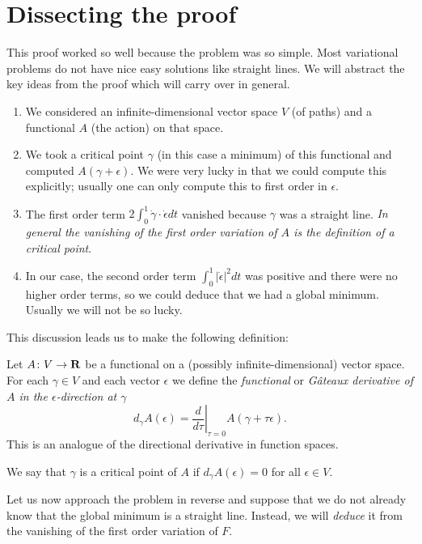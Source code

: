 \section{Dissecting the proof}

This proof worked so well because the problem was so simple. Most variational problems do not have nice easy solutions like straight lines. We will abstract the key ideas from the proof which will carry over in general.
\begin{enumerate}
\item We considered an infinite-dimensional vector space $V$ (of paths) and a functional $A$ (the action) on that space.
\item We took a critical point $\gamma$ (in this case a minimum) of this functional and computed $A(\gamma+\epsilon)$. We were very lucky in that we could compute this explicitly; usually one can only compute this to first order in $\epsilon$.
\item The first order term $2\int_0^1\dot{\gamma}\cdot\dot{\epsilon}dt$ vanished because $\gamma$ was a straight line. {\em In general the vanishing of the first order variation of $A$ is the definition of a critical point}.
\item In our case, the second order term $\int_0^1|\dot{\epsilon}|^2dt$ was positive and there were no higher order terms, so we could deduce that we had a global minimum. Usually we will not be so lucky.
\end{enumerate}

This discussion leads us to make the following definition:
\begin{dfn}
Let $A\colon V\to\mathbf{R}$ be a functional on a (possibly infinite-dimensional) vector space. For each $\gamma\in V$ and each vector $\epsilon$ we define the {\em functional} or {\em G\^{a}teaux derivative of $A$ in the $\epsilon$-direction at $\gamma$}
\[d_{\gamma}A(\epsilon)=\left.\frac{d}{d\tau}\right|_{\tau=0}A(\gamma+\tau\epsilon).\]
This is an analogue of the directional derivative in function spaces.
\end{dfn}

\begin{dfn}
We say that $\gamma$ is a critical point of $A$ if $d_{\gamma}A(\epsilon)=0$ for all $\epsilon\in V$.
\end{dfn}

Let us now approach the problem in reverse and suppose that we do not already know that the global minimum is a straight line. Instead, we will {\em deduce} it from the vanishing of the first order variation of $F$.

